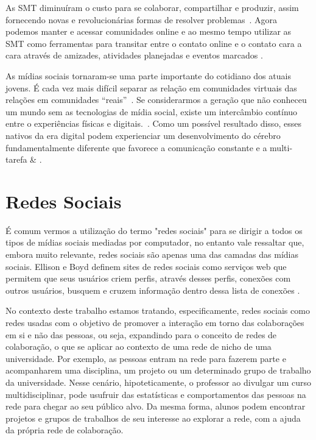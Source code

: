 As SMT diminuíram o custo para se colaborar, compartilhar e produzir,
assim fornecendo novas e revolucionárias formas de resolver problemas~\cite{shirky2010}.
%
Agora podemos manter e acessar comunidades online e ao mesmo tempo utilizar as SMT
como ferramentas para transitar entre o contato online e o contato cara a cara
através de amizades, atividades planejadas e eventos marcados \cite{shirky2010}.

As mídias sociais tornaram-se  uma parte importante do cotidiano dos atuais jovens.
É cada vez mais difícil separar as relação em comunidades virtuais das relações em
comunidades ``reais''~\cite{davis2012}.
%
Se considerarmos a geração que não conheceu um mundo sem as
tecnologias de mídia social, existe um intercâmbio contínuo entre o experiências
físicas e digitais.~\cite{davis2012}.
%
Como um possível resultado disso, esses nativos da era digital podem experienciar um
desenvolvimento do cérebro fundamentalmente diferente que favorece a comunicação
constante e a multi-tarefa \cite{prensky2001} \& \cite{vorgan2009}.

\section{Redes Sociais}

É comum vermos a utilização do termo "redes sociais" para se dirigir a todos os
tipos de mídias sociais mediadas por computador, no entanto vale ressaltar que,
embora muito relevante, redes sociais são apenas uma das camadas das mídias sociais.
%
Ellison e Boyd definem sites de redes sociais como serviços web que permitem que
seus usuários criem perfis, através desses perfis, conexões com outros usuários,
busquem e cruzem informação dentro dessa lista de conexões \cite{beer2008}.

No contexto deste trabalho estamos tratando, especificamente, redes sociais como redes 
usadas com o objetivo de promover a interação em torno das colaborações em si e
não das pessoas, ou seja, expandindo para o conceito de redes de colaboração, o que
se aplicar ao contexto de uma rede de nicho de uma universidade. 
%
Por exemplo, as pessoas entram na rede para fazerem parte e acompanharem uma disciplina, um projeto
ou um determinado grupo de trabalho da universidade.
%
Nesse cenário, hipoteticamente, o professor ao divulgar um curso multidisciplinar, pode usufruir das estatísticas e
comportamentos das pessoas na rede para chegar ao seu público alvo.
%
Da mesma forma, alunos podem encontrar projetos e grupos de trabalhos de seu interesse ao
explorar a rede, com a ajuda da própria rede de colaboração.

